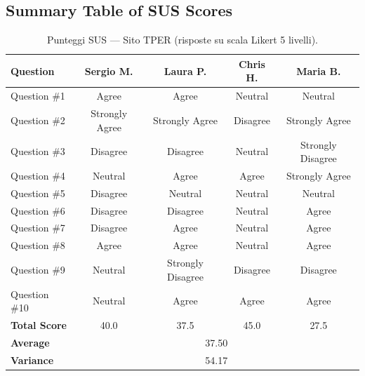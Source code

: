 ﻿\documentclass[11pt,a4paper]{article}
\begin{document}
\vspace{1cm}

\subsection*{Summary Table of SUS Scores}

\begin{table}[ht]
\centering
\label{tab:sus_scores}
\renewcommand{\arraystretch}{1.3}
\begin{tabular}{|l|c|c|c|c|}
\hline
\textbf{Question} & \textbf{Sergio M.} & \textbf{Laura P.} & \textbf{Chris H.} & \textbf{Maria B.} \\ \hline
Question \#1      & Agree          & Agree          & Neutral        & Neutral          \\ \hline
Question \#2      & Strongly Agree & Strongly Agree & Disagree       & Strongly Agree   \\ \hline
Question \#3      & Disagree       & Disagree       & Neutral        & Strongly Disagree \\ \hline
Question \#4      & Neutral        & Agree          & Agree          & Strongly Agree   \\ \hline
Question \#5      & Disagree       & Neutral        & Neutral        & Neutral          \\ \hline
Question \#6      & Disagree       & Disagree       & Neutral        & Agree            \\ \hline
Question \#7      & Disagree       & Agree          & Neutral        & Agree            \\ \hline
Question \#8      & Agree          & Agree          & Neutral        & Agree            \\ \hline
Question \#9      & Neutral        & Strongly Disagree & Disagree    & Disagree         \\ \hline
Question \#10     & Neutral        & Agree          & Agree          & Agree            \\ \hline
\textbf{\hfill Total Score} & 40.0   & 37.5          & 45.0          & 27.5             \\ \hline
\textbf{\hfill Average}     & \multicolumn{4}{c|}{37.50}                               \\ \hline
\textbf{\hfill Variance}    & \multicolumn{4}{c|}{54.17}                               \\ \hline
\end{tabular}
\caption{Punteggi SUS — Sito TPER (risposte su scala Likert 5 livelli).}
\end{table}
\end{document}
